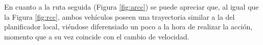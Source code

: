 
\par En cuanto a la ruta seguida (Figura \ref{fig:arcc}) se puede apreciar que, al igual que la Figura \ref{fig:rcc}, ambos vehículos poseen una trayectoria similar a la del planificador local, viéndose diferensiado un poco a la hora de realizar la acción, momento que a su vez coincide con el cambio de velocidad. 

